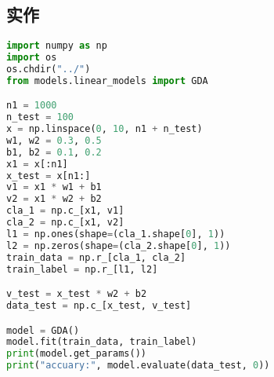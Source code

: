 \documentclass{report}
\begin{document}
\subsection{实作}
\begin{lstlisting}[language={python}]
import numpy as np
import os
os.chdir("../")
from models.linear_models import GDA

n1 = 1000
n_test = 100
x = np.linspace(0, 10, n1 + n_test)
w1, w2 = 0.3, 0.5
b1, b2 = 0.1, 0.2
x1 = x[:n1]
x_test = x[n1:]
v1 = x1 * w1 + b1
v2 = x1 * w2 + b2
cla_1 = np.c_[x1, v1]
cla_2 = np.c_[x1, v2]
l1 = np.ones(shape=(cla_1.shape[0], 1))
l2 = np.zeros(shape=(cla_2.shape[0], 1))
train_data = np.r_[cla_1, cla_2]
train_label = np.r_[l1, l2]

v_test = x_test * w2 + b2
data_test = np.c_[x_test, v_test]

model = GDA()
model.fit(train_data, train_label)
print(model.get_params())
print("accuary:", model.evaluate(data_test, 0))
\end{lstlisting}
\end{document}
